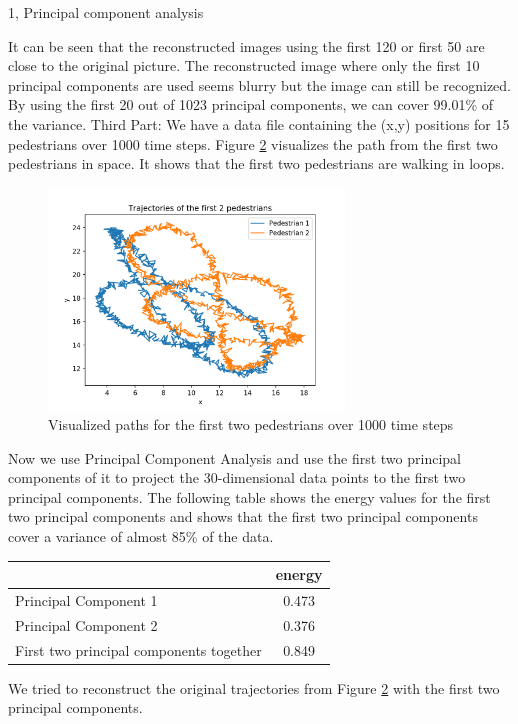 \documentclass[10pt,a4paper]{article}
\begin{document}
\begin{task}{1, Principal component analysis}
\begin{figure}[H]
\label{fig:task1_part2}
\end{figure}
It can be seen that the reconstructed images using the first 120 or first 50 are close to the original picture. The reconstructed image where only the first 10 principal components are used seems blurry but the image can still be recognized. By using the first 20 out of 1023 principal components, we can cover 99.01\% of the variance.
\bigbreak
Third Part: We have a data file containing the (x,y) positions for 15 pedestrians over 1000 time steps. Figure \ref{fig:task1_part3_1} visualizes the path from the first two pedestrians in space. It shows that the first two pedestrians are walking in loops.
\begin{figure}[H]
\centering
\includegraphics[width=0.7\textwidth]{../plots/task1/task1_3.png}
\caption{Visualized paths for the first two pedestrians over 1000 time steps}
\label{fig:task1_part3_1}
\end{figure}
Now we use Principal Component Analysis and use the first two principal components of it to project the 30-dimensional data points to the first two principal components. The following table shows the energy values for the  first two principal components and shows that the first two principal components cover a variance of almost 85\% of the data.
\begin{center}
\begin{tabular}{l|c}
& energy\\
\hline
Principal Component 1& 0.473\\
Principal Component 2& 0.376\\
First two  principal components together&0.849\\
\hline
\end{tabular}
\end{center}
We tried to reconstruct the original trajectories from Figure \ref{fig:task1_part3_1} with the first two principal components.

\end{task}
\end{document}
